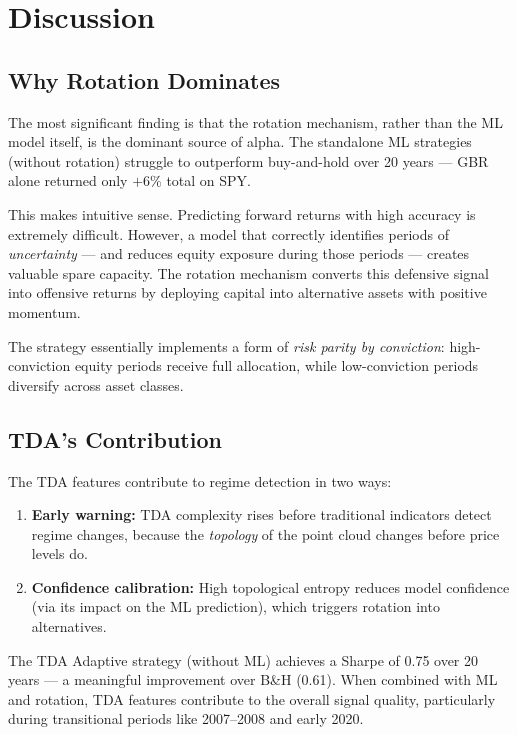 \documentclass[11pt, a4paper]{article}
\begin{document}
\section{Discussion}

\subsection{Why Rotation Dominates}

The most significant finding is that the rotation mechanism, rather than the ML model itself, is the dominant source of alpha. The standalone ML strategies (without rotation) struggle to outperform buy-and-hold over 20 years --- GBR alone returned only $+6\%$ total on SPY.

This makes intuitive sense. Predicting forward returns with high accuracy is extremely difficult. However, a model that correctly identifies periods of \emph{uncertainty} --- and reduces equity exposure during those periods --- creates valuable spare capacity. The rotation mechanism converts this defensive signal into offensive returns by deploying capital into alternative assets with positive momentum.

The strategy essentially implements a form of \emph{risk parity by conviction}: high-conviction equity periods receive full allocation, while low-conviction periods diversify across asset classes.

\subsection{TDA's Contribution}

The TDA features contribute to regime detection in two ways:
\begin{enumerate}[nosep]
    \item \textbf{Early warning:} TDA complexity rises before traditional indicators detect regime changes, because the \emph{topology} of the point cloud changes before price levels do.
    \item \textbf{Confidence calibration:} High topological entropy reduces model confidence (via its impact on the ML prediction), which triggers rotation into alternatives.
\end{enumerate}

The TDA Adaptive strategy (without ML) achieves a Sharpe of 0.75 over 20 years --- a meaningful improvement over B\&H (0.61). When combined with ML and rotation, TDA features contribute to the overall signal quality, particularly during transitional periods like 2007--2008 and early 2020.
\end{document}
